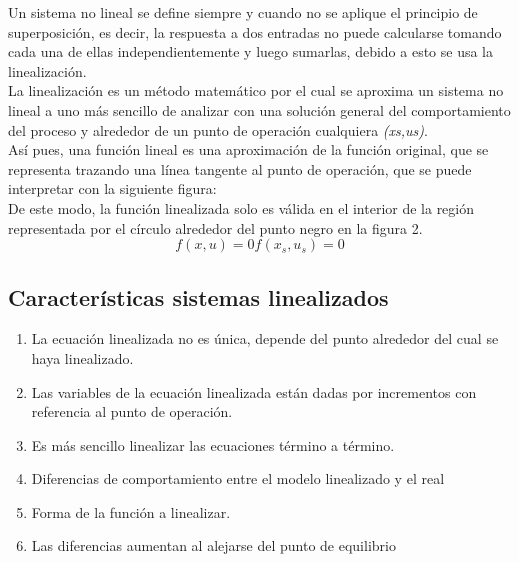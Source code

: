 \documentclass[a4paper,12pt,twoside]{proyectotanquesecci}
\begin{document}
Un sistema no lineal se define siempre y cuando no se aplique el principio de superposición, es decir, la respuesta a dos entradas no puede calcularse tomando cada una de ellas independientemente y luego sumarlas, debido a esto se usa la linealización.\\


La linealización es un método matemático por el cual se aproxima un sistema no lineal a uno más sencillo de analizar con una solución general del comportamiento del proceso y alrededor de un punto de operación cualquiera \textit{(xs,us)}.\\

Así pues, una función lineal es una aproximación de la función original, que se representa trazando una línea tangente al punto de operación, que se puede interpretar con la siguiente figura:\\


De este modo, la función linealizada solo es válida en el interior de la región representada por el círculo alrededor del punto negro en la figura 2.\\

\begin{equation}
f\left( x,u\right)=0
f\left( x_{s},u_{s}\right) =0
\end{equation}

\subsection{Características sistemas linealizados}

\begin{enumerate}
\item La ecuación linealizada no es única, depende del punto alrededor del cual se haya linealizado.
\item Las variables de la ecuación linealizada están dadas por incrementos con referencia al punto de operación.
\item Es más sencillo linealizar las ecuaciones término a término.
\item Diferencias de comportamiento entre el modelo linealizado y el real
\item Forma de la función a linealizar.
\item Las diferencias aumentan al alejarse del punto de equilibrio 
\end{enumerate}
\end{document}
